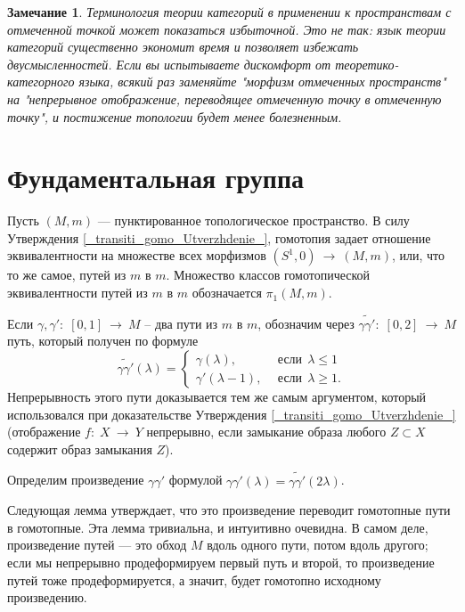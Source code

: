 \documentclass[12pt]{book}
\newcommand{\arrow}{{\:\longrightarrow\:}}
\theoremstyle{upshape}
\newtheorem{zadacha}{Задача}[chapter]
\theoremstyle{generic}
\newtheorem{remark}[teorema]{Замечание}
\def\замечание{\begin{remark}}
\def\еза{\end{remark}}
\theoremstyle{upshapenonumber}
\newcommand{\следствие}{%
     \refstepcounter{teorema}
     {\noindent\bf Следствие \thechapter.\arabic{teorema}:\ }}
\newcommand{\пример}{%
     \refstepcounter{teorema}
     {\noindent\bf Пример \thechapter.\arabic{teorema}:\ }}
\newcommand{\лемма}{%
     \refstepcounter{teorema}
     {\noindent\bf Лемма \thechapter.\arabic{teorema}:\ }}
\newcommand{\теорема}{%
     \refstepcounter{teorema}
     {\noindent\bf Теорема \thechapter.\arabic{teorema}:\ }}
\newcommand{\утверждение}{%
     \refstepcounter{teorema}
     {\noindent\bf Утверждение \thechapter.\arabic{teorema}:\ }}
\def\ем{\em}
\def\задача{\begin{zadacha}}
\def\ез{\end{zadacha}}
\def\еу{\end{ukazanie}}
\def\ео{\end{opredelenie}}
\def\енум{\begin{enumerate}}
\def\ее{\end{enumerate}}
\begin{document}
\замечание
Терминология теории категорий в применении к 
пространствам с отмеченной точкой 
может показаться избыточной. Это не так:
язык теории категорий существенно экономит время и
позволяет избежать двусмысленностей. Если вы испытываете
дискомфорт от те\-о\-ре\-ти\-ко-\-ка\-те\-гор\-но\-го
языка, всякий  раз заменяйте
"морфизм отмеченных пространств" на "непрерывное
отображение, переводящее отмеченную точку
в отмеченную точку", и постижение топологии
будет менее болезненным.
\еза


\section{Фундаментальная группа}


Пусть $(M,m)$ --- пунктированное топологическое пространство.
В силу Утверждения \ref{_transiti_gomo_Utverzhdenie_},
гомотопия задает отношение эквивалентности на 
множестве всех морфизмов $(S^1, 0) \arrow (M,m)$,
или, что то же самое, путей из $m$ в $m$.
Множество классов гомотопической эквивалентности 
путей из $m$ в $m$ обозначается $\pi_1(M,m)$.

Если $\gamma, \gamma':\; [0,1] \arrow M$ --
два пути из $m$ в $m$, обозначим через
$\widetilde{\gamma\gamma'}:\; [0,2]\arrow M$
путь, который получен по формуле
\[
\widetilde{\gamma\gamma'}(\lambda) = \begin{cases} 
\gamma(\lambda), & \ \ \text{если} \ \ \lambda\leq 1\\
\gamma'(\lambda-1), &\ \ \text{если} \ \ \lambda\geq 1.
\end{cases}
\]
Непрерывность этого пути доказывается тем же самым
аргументом, который использовался при доказательстве
Утверждения \ref{_transiti_gomo_Utverzhdenie_}
(отображение $f:\; X \arrow Y$ непрерывно, если замыкание 
образа любого $Z\subset X$ содержит образ замыкания $Z$).

Определим произведение $\gamma\gamma'$ формулой
$\gamma\gamma'(\lambda) = \widetilde{\gamma\gamma'}(2\lambda)$.

Следующая лемма утверждает, что это произведение
переводит гомотопные пути в гомотопные. Эта лемма
 тривиальна, и интуитивно очевидна.
В самом деле, произведение путей --- это обход $M$ вдоль
одного пути, потом вдоль другого; если мы непрерывно 
продеформируем первый путь и  второй, то произведение 
путей тоже продеформируется, а значит, будет
гомотопно исходному произведению.
\end{document}
